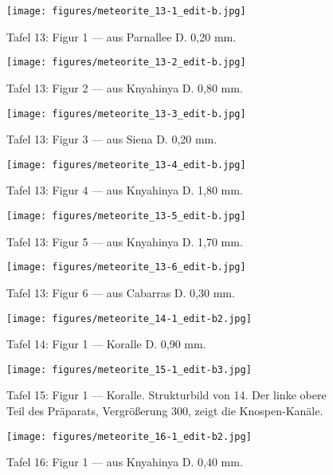 \documentclass[a4paper, 12pt, oneside]{article}
\begin{document}
\clearpage
{}
\begin{figure}[t]
\texttt{[image: figures/meteorite\_13-1\_edit-b.jpg]}
\caption{Tafel 13: Figur 1 --- aus Parnallee D. 0,20 mm.}
\centering
\end{figure}
\clearpage
\begin{figure}[t]
\texttt{[image: figures/meteorite\_13-2\_edit-b.jpg]}
\caption{Tafel 13: Figur 2 --- aus Knyahinya D. 0,80 mm.}
\centering
\end{figure}
\clearpage
\begin{figure}[t]
\texttt{[image: figures/meteorite\_13-3\_edit-b.jpg]}
\caption{Tafel 13: Figur 3 --- aus Siena D. 0,20 mm.}
\centering
\end{figure}
\clearpage
\begin{figure}[t]
\texttt{[image: figures/meteorite\_13-4\_edit-b.jpg]}
\caption{Tafel 13: Figur 4 --- aus Knyahinya D. 1,80 mm.}
\centering
\end{figure}
\clearpage
\begin{figure}[t]
\texttt{[image: figures/meteorite\_13-5\_edit-b.jpg]}
\caption{Tafel 13: Figur 5 --- aus Knyahinya D. 1,70 mm.}
\centering
\end{figure}
\clearpage
\begin{figure}[t]
\texttt{[image: figures/meteorite\_13-6\_edit-b.jpg]}
\caption{Tafel 13: Figur 6 --- aus Cabarras D. 0,30 mm.}
\centering
\end{figure}
\clearpage
{}
\begin{figure}[t]
\texttt{[image: figures/meteorite\_14-1\_edit-b2.jpg]}
\caption{Tafel 14: Figur 1 --- Koralle D. 0,90 mm.}
\centering
\end{figure}
\clearpage
{}
\begin{figure}[t]
\texttt{[image: figures/meteorite\_15-1\_edit-b3.jpg]}
\caption{Tafel 15: Figur 1 --- Koralle. Strukturbild von 14. Der linke obere Teil des Präparats, Vergrößerung 300, zeigt die Knospen-Kanäle.}
\centering
\end{figure}
\clearpage
{}
\begin{figure}[t]
\texttt{[image: figures/meteorite\_16-1\_edit-b2.jpg]}
\caption{Tafel 16: Figur 1 --- aus Knyahinya D. 0,40 mm.}
\centering
\end{figure}
\end{document}
